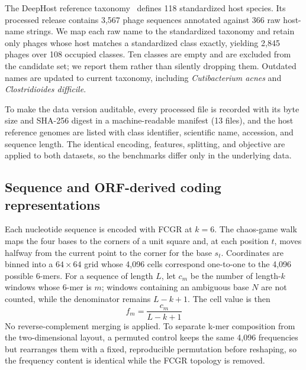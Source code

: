 \documentclass[utf8]{FrontiersinVancouver}
\begin{document}
The DeepHost reference taxonomy~\citep{wang2022deephost} defines 118 standardized host species. Its processed release contains 3,567 phage sequences annotated against 366 raw host-name strings. We map each raw name to the standardized taxonomy and retain only phages whose host matches a standardized class exactly, yielding 2,845 phages over 108 occupied classes. Ten classes are empty and are excluded from the candidate set; we report them rather than silently dropping them. Outdated names are updated to current taxonomy, including \textit{Cutibacterium acnes} and \textit{Clostridioides difficile}.

To make the data version auditable, every processed file is recorded with its byte size and SHA-256 digest in a machine-readable manifest (13 files), and the host reference genomes are listed with class identifier, scientific name, accession, and sequence length. The identical encoding, features, splitting, and objective are applied to both datasets, so the benchmarks differ only in the underlying data.

\subsection{Sequence and ORF-derived coding representations}

Each nucleotide sequence is encoded with FCGR at $k=6$. The chaos-game walk maps the four bases to the corners of a unit square and, at each position $t$, moves halfway from the current point to the corner for the base $s_t$. Coordinates are binned into a $64\times64$ grid whose 4,096 cells correspond one-to-one to the 4,096 possible 6-mers. For a sequence of length $L$, let $c_m$ be the number of length-$k$ windows whose 6-mer is $m$; windows containing an ambiguous base $N$ are not counted, while the denominator remains $L-k+1$. The cell value is then
\begin{equation}
f_m = \frac{c_m}{L-k+1}
\label{eq:1}
\end{equation}
No reverse-complement merging is applied. To separate k-mer composition from the two-dimensional layout, a permuted control keeps the same 4,096 frequencies but rearranges them with a fixed, reproducible permutation before reshaping, so the frequency content is identical while the FCGR topology is removed.
\end{document}
